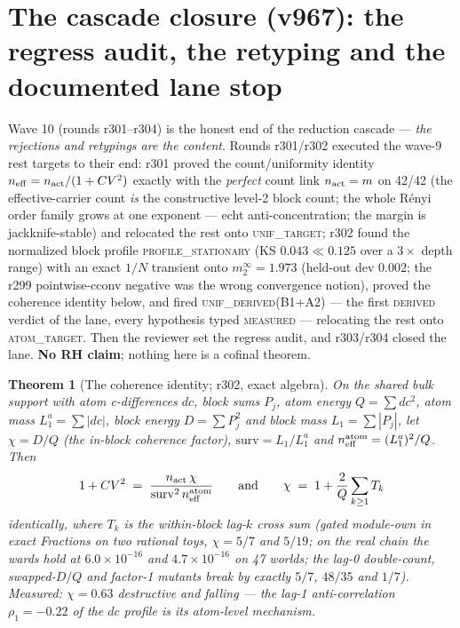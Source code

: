 \documentclass[11pt]{article}
\newtheorem{theorem}{Theorem}[section]
\theoremstyle{definition}
\theoremstyle{remark}
\begin{document}
\section{The cascade closure (v967): the regress audit, the retyping
and the documented lane stop}\label{sec:cascade-closure}

Wave 10 (rounds r301--r304) is the honest end of the reduction
cascade --- \emph{the rejections and retypings are the content}.
Rounds r301/r302 executed the wave-9 rest targets to their end: r301
proved the count/uniformity identity $n_{\rm eff} = n_{\rm act}/(1 +
CV^2)$ exactly with the \emph{perfect} count link $n_{\rm act} = m$
on 42/42 (the effective-carrier count \emph{is} the constructive
level-2 block count; the whole R\'enyi order family grows at one
exponent --- echt anti-concentration; the margin is
jackknife-stable) and relocated the rest onto \textsc{unif\_target};
r302 found the normalized block profile \textsc{profile\_stationary}
(KS $0.043 \ll 0.125$ over a $3\times$ depth range) with an exact
$1/N$ transient onto $m_2^\infty = 1.973$ (held-out dev $0.002$; the
r299 pointwise-cconv negative was the wrong convergence notion),
proved the coherence identity below, and fired
\textsc{unif\_derived}(B1{+}A2) --- the first \textsc{derived}
verdict of the lane, every hypothesis typed \textsc{measured} ---
relocating the rest onto \textsc{atom\_target}.  Then the reviewer
set the regress audit, and r303/r304 closed the lane.  \textbf{No RH
claim}; nothing here is a cofinal theorem.

\begin{theorem}[The coherence identity; r302, exact algebra]
\label{thm:coherence}
On the shared bulk support with atom c-differences $dc$, block sums
$P_j$, atom energy $Q = \sum dc^2$, atom mass $L_1^a = \sum|dc|$,
block energy $D = \sum P_j^2$ and block mass $L_1 = \sum|P_j|$, let
$\chi = D/Q$ (the in-block coherence factor), $\mathrm{surv} =
L_1/L_1^a$ and $n_{\rm eff}^{\rm atom} = (L_1^a)^2/Q$.  Then
\[
1 + CV^2 \;=\; \frac{n_{\rm act}\,\chi}{\mathrm{surv}^2\,
n_{\rm eff}^{\rm atom}}
\qquad\text{and}\qquad
\chi \;=\; 1 + \frac{2}{Q}\sum_{k\ge1} T_k
\]
identically, where $T_k$ is the within-block lag-$k$ cross sum
(gated module-own in exact Fractions on two rational toys, $\chi =
5/7$ and $5/19$; on the real chain the wards hold at
$6.0\times10^{-16}$ and $4.7\times10^{-16}$ on 47 worlds; the lag-0
double-count, swapped-$D/Q$ and factor-1 mutants break by exactly
$5/7$, $48/35$ and $1/7$).  Measured: $\chi = 0.63$
\emph{destructive} and falling --- the lag-1 anti-correlation
$\rho_1 = -0.22$ of the $dc$ profile is its atom-level mechanism.
\end{theorem}
\end{document}
